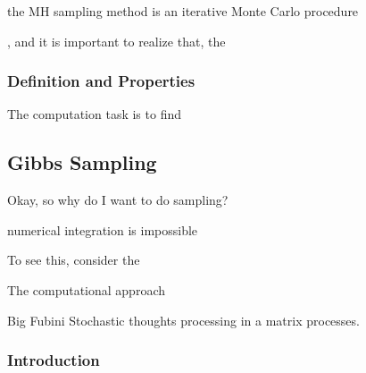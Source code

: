 \documentclass[a4paper,11pt,english]{article}
\begin{document}
			the MH sampling method is an iterative Monte Carlo procedure
			
			, and it is important to realize that, the 
			
				\subsubsection{Definition and Properties}
			
			
	
				The computation task is to find 			
			
	
		\subsection{Gibbs Sampling}

		Okay, so why do I want to do sampling? 
		
		numerical integration is impossible			
			
		To see this, consider the 
		
		The computational approach 
		
		Big Fubini Stochastic thoughts processing in a matrix processes.
		
			\subsubsection{Introduction}
			
\end{document}
